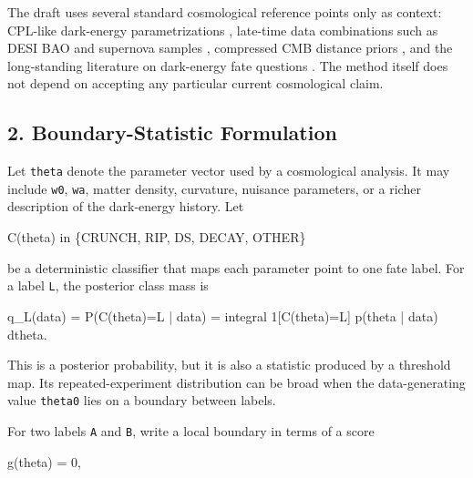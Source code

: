 \documentclass[
]{article}
\newenvironment{Shaded}{}{}
\newcommand{\NormalTok}[1]{#1}
\begin{document}
The draft uses several standard cosmological reference points only as
context: CPL-like dark-energy parametrizations
\citep{ChevallierPolarski2001, Linder2003}, late-time data combinations
such as DESI BAO and supernova samples \citep{DESIDR2, Brout2022},
compressed CMB distance priors \citep{ChenHuangWang2018}, and the
long-standing literature on dark-energy fate questions
\citep{Dyson1979, KraussTurner1999, KraussStarkman2000, Caldwell2003}.
The method itself does not depend on accepting any particular current
cosmological claim.

\subsection{2. Boundary-Statistic
Formulation}\label{boundary-statistic-formulation}

Let \texttt{theta} denote the parameter vector used by a cosmological
analysis. It may include \texttt{w0}, \texttt{wa}, matter density,
curvature, nuisance parameters, or a richer description of the
dark-energy history. Let

\begin{Shaded}
\begin{Highlighting}[]
\NormalTok{C(theta) in \{CRUNCH, RIP, DS, DECAY, OTHER\}}
\end{Highlighting}
\end{Shaded}

be a deterministic classifier that maps each parameter point to one fate
label. For a label \texttt{L}, the posterior class mass is

\begin{Shaded}
\begin{Highlighting}[]
\NormalTok{q\_L(data) = P(C(theta)=L | data)}
\NormalTok{          = integral 1[C(theta)=L] p(theta | data) dtheta.}
\end{Highlighting}
\end{Shaded}

This is a posterior probability, but it is also a statistic produced by
a threshold map. Its repeated-experiment distribution can be broad when
the data-generating value \texttt{theta0} lies on a boundary between
labels.

For two labels \texttt{A} and \texttt{B}, write a local boundary in
terms of a score

\begin{Shaded}
\begin{Highlighting}[]
\NormalTok{g(theta) = 0,}
\end{Highlighting}
\end{Shaded}
\end{document}

